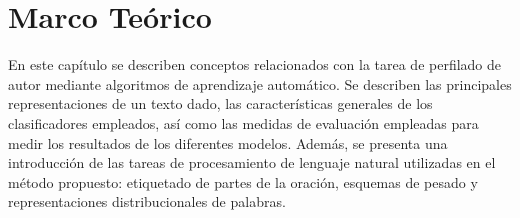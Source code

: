 \chapter{Marco Teórico}

En este capítulo se describen conceptos relacionados con la tarea de perfilado de autor mediante algoritmos de aprendizaje automático. Se describen las principales representaciones de un texto dado, las características generales de los clasificadores empleados, así como las medidas de evaluación empleadas para medir los resultados de los diferentes modelos. Además, se presenta una introducción de las tareas de procesamiento de lenguaje natural utilizadas en el método propuesto: etiquetado de partes de la oración, esquemas de pesado y representaciones distribucionales de palabras.







